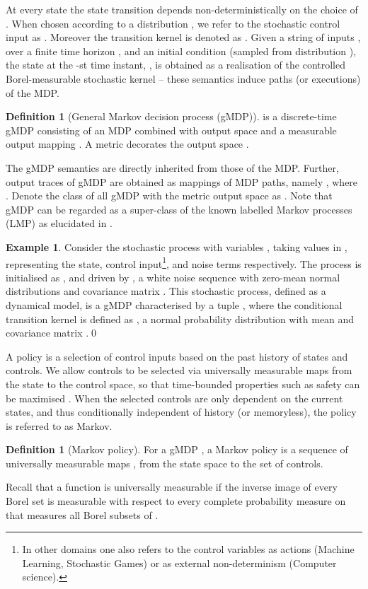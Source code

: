 \documentclass[letterpaper, 10 pt, conference]{amsart}
\theoremstyle{definition}
\newtheorem{defn}[definition]{Definition}
\theoremstyle{example}
\newtheorem{example}{Example}
\theoremstyle{remark}
\begin{document}
At every state the state transition depends non-deterministically on the choice of .  
When chosen according to 
a distribution  , we refer to the stochastic control input as . Moreover   
the transition kernel is denoted as . 
Given a string of inputs ,  
over a finite time horizon , 
and an initial condition   (sampled from distribution ), 
the state at the -st time instant, ,
is obtained as a realisation of the controlled Borel-measurable stochastic kernel  -- 
these semantics induce paths (or executions) of the MDP.   
\begin{defn}[General Markov decision process (gMDP)] 
 is a discrete-time gMDP consisting of an MDP combined with output space  and a measurable output mapping .   
A metric  decorates the output space .  \end{defn}
The gMDP semantics are directly inherited from those of the MDP. 
Further, output traces of gMDP are obtained as mappings of MDP paths, namely 
, 
where . Denote the 
class of all gMDP with the metric output space  as . Note that gMDP 
can be regarded as a super-class of the known labelled Markov processes (LMP) \cite{desharnais2004metrics} as elucidated in \cite{bcAKNP14}. 
\begin{example}\label{ex11}
Consider the stochastic process 
with variables , 
taking values in , 
representing the state, control input\footnote{ In other domains one also refers to the control variables as actions (Machine Learning, Stochastic Games) or as external non-determinism (Computer science).}, and noise
terms respectively. 
The process is initialised as , 
and driven by , 
a white noise sequence with zero-mean normal distributions and covariance matrix . This stochastic process, defined as a dynamical model, 
is a gMDP characterised by a tuple , 
where the conditional transition kernel is defined as , 
a normal probability distribution with mean  and covariance matrix .\qed
\end{example} 

A policy is a selection of control inputs based on the past history of states and controls. 
We allow controls to be selected via universally measurable maps \cite{bible} from the state to the control space, 
so that time-bounded properties such as safety can be maximised \cite{Abate1}. 
When the selected controls are only dependent on the current states, 
and thus conditionally independent of history (or memoryless), 
the policy is referred to as Markov. 
\begin{defn}[Markov policy]\label{def:markovpolicy}
For a gMDP , a Markov policy  is a sequence  of universally measurable maps  , from the state space  to the set of controls.
\end{defn}
Recall that a function  is universally measurable  if the inverse image of every Borel set is measurable with respect to every complete probability measure on  that measures all Borel subsets of . 
\end{document}
